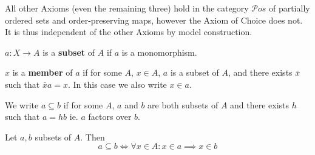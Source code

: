 \begin{remark}
All other Axioms (even the remaining three) hold in the category $\mathcal{P}os$ of partially ordered sets and order-preserving maps, however the Axiom of Choice does not. It is thus independent of the other Axioms by model construction. 
\end{remark}

\begin{definition}
$a:X \longrightarrow A$ is a \textbf{subset} of $A$ if $a$ is a monomorphism.

$x$ is a \textbf{member} of $a$ if for some $A$, $x \in A$, $a$ is a subset of $A$, and there exists $\bar{x}$ such that $\bar{x}a = x$. In this case we also write $x \in a$.

We write $a \subseteq b$ if for some $A$, $a$ and $b$ are both subsets of $A$ and there exists $h$ such that $a = hb$ ie. $a$ factors over $b$.
\end{definition}

\begin{theorem}
Let $a, b$ subsets of $A$. Then
\begin{equation}
a \subseteq b \iff \forall x \in A: x \in a \implies x \in b
\end{equation}
\end{theorem}

